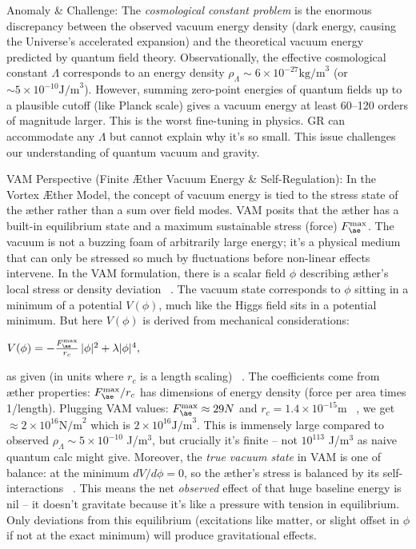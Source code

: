 \documentclass[a4paper, aps,preprint,superscriptaddress, 12pt]{revtex4}
\begin{document}
Anomaly \& Challenge: The \textit{cosmological constant problem} is the enormous discrepancy between the observed vacuum energy density (dark energy, causing the Universe’s accelerated expansion) and the theoretical vacuum energy predicted by quantum field theory. Observationally, the effective cosmological constant $\Lambda$ corresponds to an energy density $\rho_{\Lambda}\sim 6\times10^{-27}\text{kg/m}^3$ (or $\sim 5\times10^{-10}\text{J/m}^3$). However, summing zero-point energies of quantum fields up to a plausible cutoff (like Planck scale) gives a vacuum energy at least 60–120 orders of magnitude larger. This is the worst fine-tuning in physics. GR can accommodate any $\Lambda$ but cannot explain why it’s so small. This issue challenges our understanding of quantum vacuum and gravity.


VAM Perspective (Finite Æther Vacuum Energy \& Self-Regulation): In the Vortex Æther Model, the concept of vacuum energy is tied to the stress state of the æther rather than a sum over field modes. VAM posits that the æther has a built-in equilibrium state and a maximum sustainable stress (force) $F_{\ae}^{\max}$. The vacuum is not a buzzing foam of arbitrarily large energy; it’s a physical medium that can only be stressed so much by fluctuations before non-linear effects intervene. In the VAM formulation, there is a scalar field $\phi$ describing æther’s local stress or density deviation~\cite{Iskandarani2025c} . The vacuum state corresponds to $\phi$ sitting in a minimum of a potential $V(\phi)$, much like the Higgs field sits in a potential minimum. But here $V(\phi)$ is derived from mechanical considerations:

$V(\phi) = -\frac{F_{\ae}^{\max}}{r_c}\,|\phi|^2 + \lambda |\phi|^4,$

as given (in units where $r_c$ is a length scaling)~\cite{Iskandarani2025c} . The coefficients come from æther properties: $F_{\ae}^{\max}/r_c$ has dimensions of energy density (force per area times 1/length). Plugging VAM values: $F_{\ae}^{\max}\approx 29N$ and $r_c=1.4\times10^{-15}\text{m}$~\cite{VAM_constants} , we get $\approx 2\times10^{16}\text{N/m}^2$ which is $2\times10^{16}\text{J/m}^3$. This is immensely large compared to observed $\rho_\Lambda\sim5\times10^{-10}$ J/m$^3$, but crucially it’s finite – not $10^{113}$ J/m$^3$ as naive quantum calc might give. Moreover, the \textit{true vacuum state} in VAM is one of balance: at the minimum $dV/d\phi=0$, so the æther’s stress is balanced by its self-interactions~\cite{Iskandarani2025c} . This means the net \textit{observed} effect of that huge baseline energy is nil – it doesn’t gravitate because it’s like a pressure with tension in equilibrium. Only deviations from this equilibrium (excitations like matter, or slight offset in $\phi$ if not at the exact minimum) will produce gravitational effects.
\end{document}
